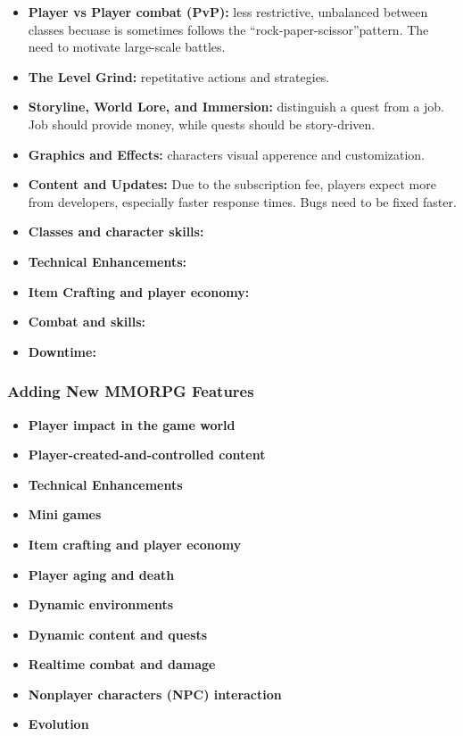     \begin{itemize}
      \item {\bf Player vs Player combat (PvP):} less restrictive, unbalanced between classes becuase is sometimes follows the ``rock-paper-scissor''pattern. The need to motivate large-scale battles. 
      \item {\bf The Level Grind:} repetitative actions and strategies. 
      \item {\bf Storyline, World Lore, and Immersion:} distinguish a quest from a job. Job should provide money, while quests should be story-driven.  
      \item {\bf Graphics and Effects:} characters visual apperence and customization. 
      \item {\bf Content and Updates:} Due to the subscription fee, players expect more from developers, especially faster response times. Bugs need to be fixed faster. 
      \item {\bf Classes and character skills:} 
      \item {\bf Technical Enhancements:}
      \item {\bf Item Crafting and player economy:}
      \item {\bf Combat and skills:}
      \item {\bf Downtime:}
    \end{itemize}

    \subsubsection*{Adding New MMORPG Features}

    \begin{itemize}
        \item {\bf Player impact in the game world}
        \item {\bf Player-created-and-controlled content}
        \item {\bf Technical Enhancements}
        \item {\bf Mini games}
        \item {\bf Item crafting and player economy}
        \item {\bf Player aging and death}
        \item {\bf Dynamic environments}
        \item {\bf Dynamic content and quests}
        \item {\bf Realtime combat and damage}
        \item {\bf Nonplayer characters (NPC) interaction}
        \item {\bf Evolution}
      \end{itemize}
